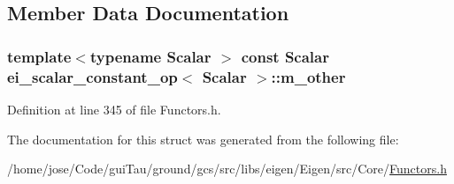 \subsection{Member Data Documentation}
\hypertarget{structei__scalar__constant__op_af8f40e3a9b4bd2473fc43cc9a2962572}{
\subsubsection[{m\-\_\-other}]{\setlength{\rightskip}{0pt plus 5cm}template$<$typename Scalar $>$ const Scalar {\bf ei\-\_\-scalar\-\_\-constant\-\_\-op}$<$ Scalar $>$\-::m\-\_\-other}}\label{structei__scalar__constant__op_af8f40e3a9b4bd2473fc43cc9a2962572}


Definition at line 345 of file Functors.\-h.



The documentation for this struct was generated from the following file\-:\begin{DoxyCompactItemize}
\item 
/home/jose/\-Code/gui\-Tau/ground/gcs/src/libs/eigen/\-Eigen/src/\-Core/\hyperlink{_core_2_functors_8h}{Functors.\-h}\end{DoxyCompactItemize}
